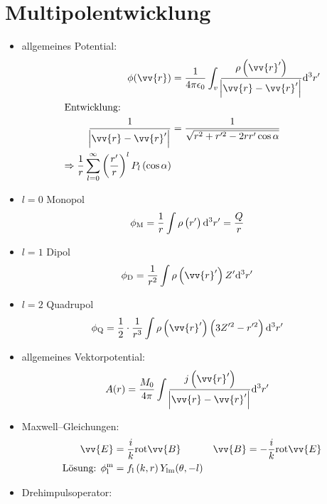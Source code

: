 \documentclass[BCOR=5mm,DIV=calc,listof=totoc,headings=big]{scrartcl}
\newcommand{\de}{\mathrm{d}}
\newcommand{\half}{\frac{1}{2}}
\begin{document}
\section{Multipolentwicklung}
\label{sec:multipolentwicklung}
\begin{itemize}
\item allgemeines Potential:
  \begin{align*}
    \phi(\vv{r})&=\frac{1}{4\pi\epsilon_{0}}
    \int_{v}\frac{\rho\del{\vv{r}^{\prime}}}{\abs{\vv{r}-\vv{r}^{\prime}}}
    \de^{3}r^{\prime}\\
    \intertext{Entwicklung:}
    \frac{1}{\abs{\vv{r}-\vv{r}^{\prime}}}&=\frac{1}{\sqrt{r^{2}+r^{\prime
        2}-2rr^{\prime}\cos\alpha}}\\
  \Rightarrow \frac{1}{r}
  \sum_{l=0}^{\infty}\del{\frac{r^{\prime}}{r}}^{l} P_{l}\del{\cos\alpha}
  \end{align*}
\item $l=0$ Monopol
  \begin{align*}
    \phi_{\mathrm{M}}&=\frac{1}{r} \int \rho\del{r^{\prime}} \de^{3} r^{\prime}=\frac{Q}{r}
  \end{align*}
\item $l=1$ Dipol
  \begin{align*}
    \phi_{\mathrm{D}}&=\frac{1}{r^{2}} \int \rho\del{\vv{r}^{\prime}}
    Z^{\prime} \de^{3} r^{\prime}
  \end{align*}
\item $l=2$ Quadrupol
  \begin{align*}
    \phi_{\mathrm{Q}}&=\half \cdot \frac{1}{r^{3}} \int \rho\del{\vv{r}^{\prime}}
    \del{3 Z^{\prime 2}-r^{\prime 2}} \de^{3} r^{\prime}
  \end{align*}
\item allgemeines Vektorpotential:
  \begin{align*}
    A(r)&=\frac{M_{0}}{4\pi} \int
    \frac{j\del{\vv{r}^{\prime}}}{\abs{\vv{r}-\vv{r}^{\prime}}}
    \de^{3} r^{\prime}
  \end{align*}
\item Maxwell--Gleichungen:
  \begin{align*}
    \vv{E}&=\frac{i}{k} \text{rot}\vv{B} & \vv{B}&=-\frac{i}{k}
    \text{rot}\vv{E}\\
    \text{Lösung: }\phi_{\mathrm{l}}^{\mathrm{m}}&=f_{\mathrm{l}}\del{k,r} Y_{\mathrm{lm}}(\theta,-l)
  \end{align*}
\item Drehimpulsoperator:
  \begin{align*}

\end{align*}
\end{itemize}
\end{document}
